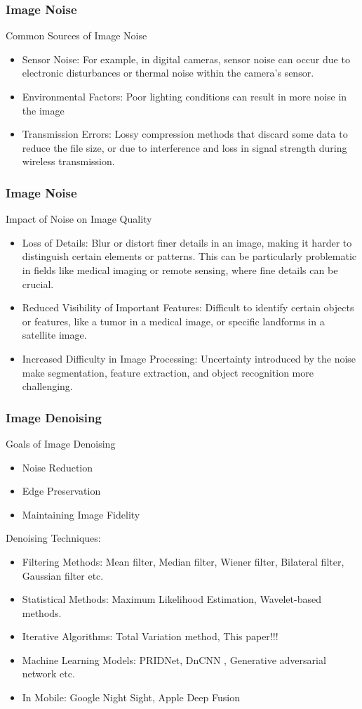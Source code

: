 \documentclass{beamer}
\begin{document}
\begin{frame}[plain]
\frametitle{Image Noise}
Common Sources of Image Noise
    \begin{itemize}
        \item Sensor Noise:  For example, in digital cameras, sensor noise can occur due to electronic disturbances or thermal noise within the camera's sensor.
        \item Environmental Factors: Poor lighting conditions can result in more noise in the image
        \item Transmission Errors: Lossy compression methods that discard some data to reduce the file size, or due to interference and loss in signal strength during wireless transmission.
    \end{itemize}
\end{frame}

\begin{frame}[plain]
\frametitle{Image Noise}
Impact of Noise on Image Quality
    \begin{itemize}
        \item Loss of Details:  Blur or distort finer details in an image, making it harder to distinguish certain elements or patterns. This can be particularly problematic in fields like medical imaging or remote sensing, where fine details can be crucial.
        \item Reduced Visibility of Important Features: Difficult to identify certain objects or features, like a tumor in a medical image, or specific landforms in a satellite image.
        \item Increased Difficulty in Image Processing: Uncertainty introduced by the noise make segmentation, feature extraction, and object recognition more challenging.
    \end{itemize}
\end{frame}


\begin{frame}[t]
\frametitle{Image Denoising}
Goals of Image Denoising
    \begin{itemize}
        \item Noise Reduction
        \item Edge Preservation
        \item Maintaining Image Fidelity
    \end{itemize}
     Denoising Techniques:
     \begin{itemize}
        \item Filtering Methods: Mean filter, Median filter, Wiener filter, Bilateral filter, Gaussian filter etc. 
        \item Statistical Methods: Maximum Likelihood Estimation,  Wavelet-based methods. 
        \item Iterative Algorithms: Total Variation method, This paper!!!
        \item Machine Learning Models: PRIDNet, DnCNN , Generative adversarial network etc.
        \item In Mobile: Google Night Sight, Apple Deep Fusion
    \end{itemize}
\end{frame}
\end{document}
